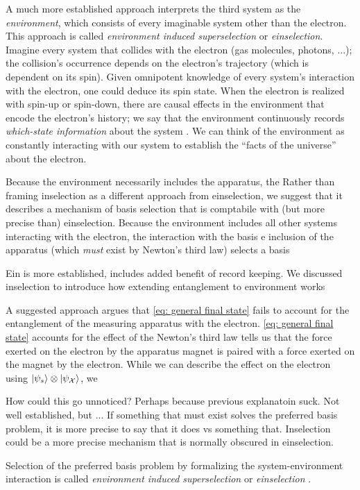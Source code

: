 A much more established approach interprets the third system as the \textit{environment}, which consists of every imaginable system other than the electron. This approach is called \textit{environment induced superselection} or \textit{einselection}. Imagine every system that collides with the electron (gas molecules, photons, ...); the collision's occurrence depends on the electron's trajectory (which is dependent on its spin). Given omnipotent knowledge of every system's interaction with the electron, one could deduce its spin state. When the electron is realized with spin-up or spin-down, there are causal effects in the environment that encode the electron's history; we say that the environment continuously records \textit{which-state information} about the system \cite{Schlosshauer}. We can think of the environment as constantly interacting with our system to establish the ``facts of the universe'' about the electron.

Because the environment necessarily includes the apparatus, the
Rather than framing inselection as a different approach from einselection, we suggest that it describes a mechanism of basis selection that is comptabile with (but more precise than) einselection. Because the environment includes all other systems interacting with the electron, the interaction with the basis e inclusion of the apparatus (which \textit{must} exist by Newton's third law) selects a basis


Ein is more established, includes added benefit of record keeping. We discussed inselection to introduce how extending entanglement to  environment works

A suggested approach argues that \autoref{eq: general final state} fails to account for the entanglement of the measuring apparatus with the electron. \autoref{eq: general final state} accounts for the effect of the  Newton's third law tells us that the force exerted on the electron by the apparatus magnet is paired with a force exerted on the magnet by the electron. While we can describe the effect on the electron using $\ket{\psi_s} \otimes \ket{\psi_\mathcal{X}}$, we

How could this go unnoticed? Perhaps because previous explanatoin suck. Not well established, but ...
If something that must exist solves the preferred basis problem, it is more precise to say that it does vs something that. Inselection could be  a more precise mechanism that is normally obscured in einselection.

 Selection of the preferred basis problem by formalizing the system-environment interaction is called \textit{environment induced superselection} or \textit{einselection} \cite{Zurek}.

